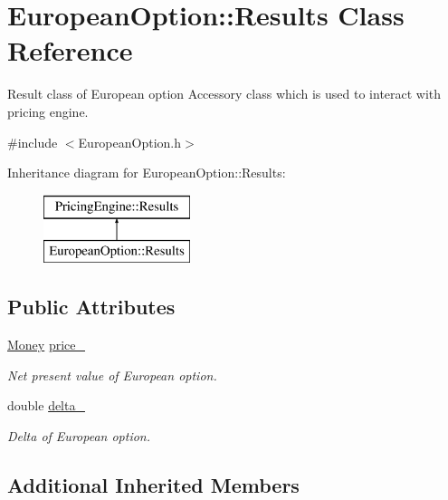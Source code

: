 \hypertarget{class_european_option_1_1_results}{}\section{European\+Option\+:\+:Results Class Reference}
\label{class_european_option_1_1_results}


Result class of European option Accessory class which is used to interact with pricing engine.  




{\ttfamily \#include $<$European\+Option.\+h$>$}

Inheritance diagram for European\+Option\+:\+:Results\+:\begin{figure}[H]
\begin{center}
\leavevmode
\includegraphics[height=2.000000cm]{class_european_option_1_1_results}
\end{center}
\end{figure}
\subsection*{Public Attributes}
\begin{DoxyCompactItemize}
\item 
\hyperlink{_name_def_8h_a5a9d48c16a694e9a2d9f1eca730dc8c5}{Money} \hyperlink{class_european_option_1_1_results_a517b87143fda866b135b21051dc4fd6c}{price\+\_\+}
\begin{DoxyCompactList}\small\item\em Net present value of European option. \end{DoxyCompactList}\item 
double \hyperlink{class_european_option_1_1_results_a3e9ddb58f8e1f69b972bfed5e893414b}{delta\+\_\+}
\begin{DoxyCompactList}\small\item\em Delta of European option. \end{DoxyCompactList}\end{DoxyCompactItemize}
\subsection*{Additional Inherited Members}



